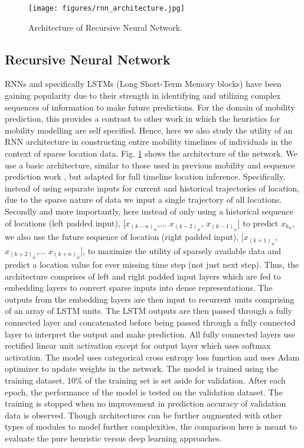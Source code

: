 \begin{figure}[t]
\centering
\texttt{[image: figures/rnn\_architecture.jpg]}
\caption{Architecture of Recursive Neural Network.}
\label{RNN_fig}
\end{figure}

\subsection{Recursive Neural Network}
RNNs and specifically LSTMs (Long Short-Term Memory blocks) have been gaining popularity due to their strength in identifying and utilizing complex sequences of information to make future predictions. For the domain of mobility prediction, this provides a contrast to other work in which the heuristics for mobility modelling are self specified. Hence, here we also study the utility of an RNN architecture in constructing entire mobility timelines of individuals in the context of sparse location data. Fig. \ref{RNN_fig} shows the architecture of the network. We use a basic architecture, similar to those used in previous mobility and sequence prediction work \cite{feng2018deepmove}, but adapted for full timeline location inference. Specifically, instead of using separate inputs for current and historical trajectories of location, due to the sparse nature of data we input a single trajectory of all locations. Secondly and more importantly, here instead of only using a historical sequence of locations (left padded input), [$x_{(k-n)_w}$,... $x_{(k-2)_w}$, $x_{(k-1)_w}$] to predict $x_{k_w}$, we also use the future sequence of location (right padded input), [$x_{(k+1)_w}$, $x_{(k+2)_w}$,... $x_{(k+n)_w}$], to maximize the utility of sparsely available data and predict a location value for ever missing time step (not just next step). Thus, the architecture comprises of left and right padded input layers which are fed to embedding layers to convert sparse inputs into dense representations. The outputs from the embedding layers are then input to recurrent units comprising of an array of LSTM units. The LSTM outputs are then passed through a fully connected layer and concatenated before being passed through a fully connected layer to interpret the output and make prediction. 
All fully connected layers use rectified linear unit activation except for output layer which uses softmax activation. The model uses categorical cross entropy loss function and uses Adam optimizer to update weights in the network. The model is trained using the training dataset. 10\% of the training set is set aside for validation. After each epoch, the performance of the model is tested on the validation dataset. 
The training is stopped when no improvement in prediction accuracy of validation data is observed. Though architectures can be further augmented with other types of modules to model further complexities, the comparison here is meant to evaluate the pure heuristic versus deep learning approaches.


